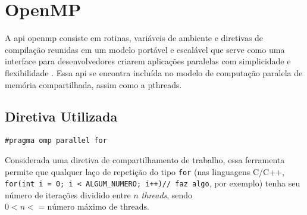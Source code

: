 \section{OpenMP}

A \acrshort{api} \acrfull{openmp} consiste em rotinas, 
variáveis de ambiente e diretivas de compilação reunidas em um 
modelo portável e escalável que serve como uma interface para 
desenvolvedores criarem aplicações paralelas com simplicidade e 
flexibilidade \cite{wiki:openmp}. Essa \acrshort{api} se encontra 
incluída no modelo de computação paralela de memória compartilhada, 
assim como a \acrshort{pthreads}.

\subsection{Diretiva Utilizada}
\begin{lstlisting}
#pragma omp parallel for
\end{lstlisting}
Considerada uma diretiva de compartilhamento de trabalho, essa 
ferramenta permite que qualquer laço de repetição do tipo \texttt{for} 
(nas linguagens C/C++, 
\lstinline[columns=fixed]{for(int i = 0; i < ALGUM_NUMERO; i++)// faz algo}, 
por exemplo) tenha seu número de iterações dividido entre $n$ \textit{\gls{threads}}, 
sendo $0 < n <= \text{número máximo de threads}$.